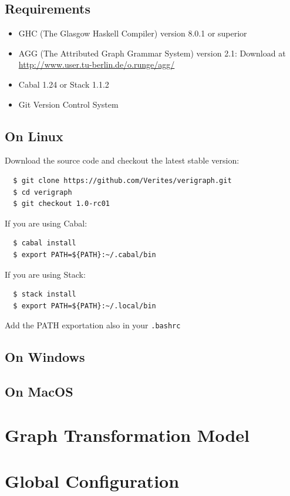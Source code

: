 \documentclass[12pt]{article}
\begin{document}
\subsection{Requirements}
\begin{itemize}
\item GHC (The Glasgow Haskell Compiler) version 8.0.1 or superior
\item AGG (The Attributed Graph Grammar System) version 2.1: Download at \url{http://www.user.tu-berlin.de/o.runge/agg/}
\item Cabal 1.24 or Stack 1.1.2
\item Git Version Control System 
\end{itemize}

\subsection{On Linux}

Download the source code and checkout the latest stable version:
\begin{verbatim}
  $ git clone https://github.com/Verites/verigraph.git
  $ cd verigraph
  $ git checkout 1.0-rc01
\end{verbatim}


If you are using Cabal:
\begin{verbatim}
  $ cabal install
  $ export PATH=${PATH}:~/.cabal/bin
\end{verbatim}

If you are using Stack:
\begin{verbatim}
  $ stack install
  $ export PATH=${PATH}:~/.local/bin
\end{verbatim}

Add the PATH exportation also in your \texttt{.bashrc}

\subsection{On Windows}

\subsection{On MacOS}

\section{Graph Transformation Model}

\section{Global Configuration}
\end{document}
